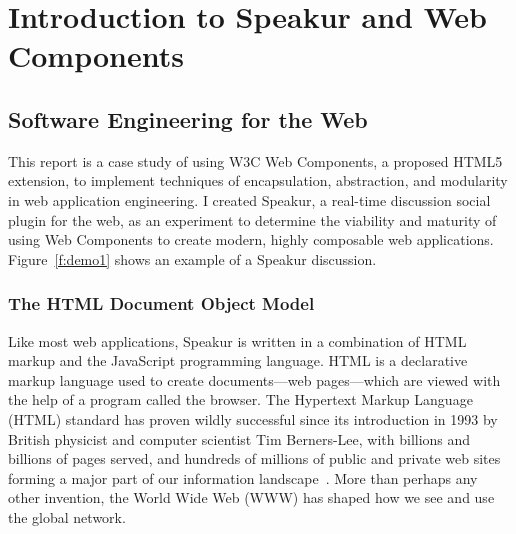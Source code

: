 \chapter{Introduction to Speakur and Web Components}
%
\label{ch:intro}

%
%

\section{Software Engineering for the Web}
This report is a case study of using W3C Web Components, 
a proposed HTML5 extension,
to implement techniques of encapsulation, abstraction, 
and modularity in web application engineering.
I created Speakur, a real-time discussion social plugin for the web, 
as an experiment to determine the viability and maturity of using Web Components to create modern, highly composable web applications. 
Figure~\ref{f:demo1} shows an example of a Speakur discussion.

\subsection{The HTML Document Object Model}
Like most web applications, Speakur is written in a combination of HTML markup and the Java\-Script programming language. 
HTML is a declarative markup language used to create documents---web pages---which are viewed with the help of a program called the browser. 
The Hyper\-text Markup Language (HTML) 
standard has proven wildly successful since its introduction in 1993 by British physicist and computer scientist 
Tim Berners-Lee, 
with billions and billions of pages served, 
and hundreds of millions of public and private web sites forming a major part of our information landscape~\cite{internetlivestats.com2015}.
More than perhaps any other invention, the World Wide Web (WWW) has shaped how we see and use the global network.


